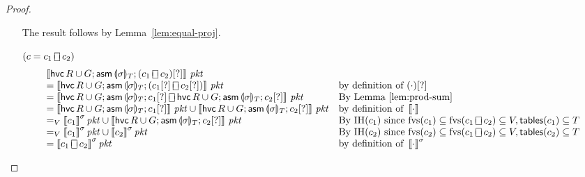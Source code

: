 \documentclass{article}
\newcommand{\pkt}{\mathit{pkt}}
\newcommand{\denote}[1]{\left\llbracket#1\right\rrbracket}
\newcommand{\assume}{\mathop{\mathsf{asm}}}
\newcommand{\choiceop}{\rotatebox[origin=c]{90}{$\sqsubset\!\!\!\sqsupset$}}
\newcommand{\choice}{\mathbin{\choiceop}}
\newcommand{\havoc}[1]{\mathop{\mathsf{hvc}}#1}
\newcommand{\state}[1]{\llparenthesis#1\rrparenthesis}
\newcommand{\instr}{[?]}
\newcommand{\fvs}{\textrm{fvs}}
\newcommand{\tables}{\mathop{\mathsf{tables}}}
\theoremstyle{plain}
\theoremstyle{definition}
\theoremstyle{remark}
\begin{document}
\begin{proof}
\begin{enumerate}[align=left]
    The result follows by Lemma~\ref{lem:equal-proj}.

  \item[$(c = c_1\choice c_2)$]
    \[\begin{array}{ll}
    \denote{\havoc{R \cup G};\assume{\state\sigma_{T}}; (c_1 \choice c_2)\instr}\,\pkt
    & \\
    = \denote{\havoc{R \cup G};\assume{\state\sigma_{T}}; (c_1\instr \choice c_2\instr)}\,\pkt
    & \text{by definition of }(\cdot)\instr\\
    = \denote{\havoc{R \cup G};\assume{\state\sigma_{T}}; c_1\instr
      \choice \havoc{R \cup G};\assume{\state\sigma_{T}}; c_2\instr}\,\pkt
    & \text{By Lemma~\ref{lem:prod-sum}} \\
    = \denote{\havoc{R \cup G}; \assume{\state\sigma_{T}}; c_1\instr}\,\pkt
    \cup \denote{\havoc{R \cup G}; \assume{\state\sigma_{T}}; c_2\instr}\,\pkt
    & \text{by definition of }\denote{\cdot} \\
    =_V \denote{c_1}^\sigma\pkt \cup \denote{\havoc{R \cup G}; \assume{\state\sigma_{T}}; c_2\instr}\,\pkt
    & \text{By IH}(c_1) \text{ since } \fvs(c_1) \subseteq \fvs(c_1 \choice c_2) \subseteq V, \tables(c_1) \subseteq T \\
    =_V \denote{c_1}^\sigma\pkt \cup \denote{c_2}^\sigma\pkt
    & \text{By IH}(c_2) \text{ since } \fvs(c_2) \subseteq \fvs(c_1 \choice c_2) \subseteq V, \tables(c_2) \subseteq T \\
    = \denote{c_1 \choice c_2}^\sigma\pkt
    & \text{by definition of }\denote{\cdot}^\sigma
    \end{array}
    \]


\end{enumerate}
\end{proof}
\end{document}
